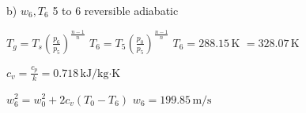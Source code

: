 b) \( w_6, T_6 \)  
5 to 6 reversible adiabatic  

\( T_g = T_s \left( \frac{p_6}{p_5} \right)^{\frac{n-1}{n}} \)  
\( T_6 = T_5 \left( \frac{p_0}{p_5} \right)^{\frac{n-1}{n}} \)  
\( T_6 = 288.15 \, \text{K} \)  
\( = 328.07 \, \text{K} \)  

\( c_v = \frac{c_p}{k} = 0.718 \, \text{kJ/kg·K} \)  

\( w_6^2 = w_0^2 + 2c_v(T_0 - T_6) \)  
\( w_6 = 199.85 \, \text{m/s} \)